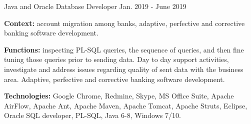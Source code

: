 \begin{cventries}
  \cventry
    {Java and Oracle Database Developer} %
    {} %
    {} %
    {Jan. 2019 - June 2019} %
    {
      \begin{cvitems} %
		\item[] {\textbf{Context:} account migration among banks, adaptive, perfective and corrective banking software development. 
}
		\item[] {\textbf{Functions:} inspecting PL-SQL queries, the sequence of queries, and then fine tuning those queries prior to sending data. Day to day support activities, investigate and address issues regarding quality of sent data with the business area. Adaptive, perfective and corrective banking software development.}		
		\item[] {\textbf{Technologies:} \textcolor{rainbowcolor-olive}{Google Chrome}, \textcolor{rainbowcolor-olive}{Redmine}, \textcolor{rainbowcolor-olive}{Skype}, \textcolor{rainbowcolor-olive}{MS Office Suite}, \textcolor{rainbowcolor-olive}{Apache AirFlow}, \textcolor{rainbowcolor-olive}{Apache Ant}, \textcolor{rainbowcolor-olive}{Apache Maven}, \textcolor{rainbowcolor-olive}{Apache Tomcat}, \textcolor{rainbowcolor-olive}{Apache Struts}, \textcolor{rainbowcolor-olive}{Eclipse}, \textcolor{rainbowcolor-olive}{Oracle SQL developer}, \textcolor{rainbowcolor-indigo}{PL-SQL}, \textcolor{rainbowcolor-indigo}{Java 6-8}, \textcolor{rainbowcolor-orange}{Windows 7/10}.}		
      \end{cvitems}
    } 
    

\end{cventries}
